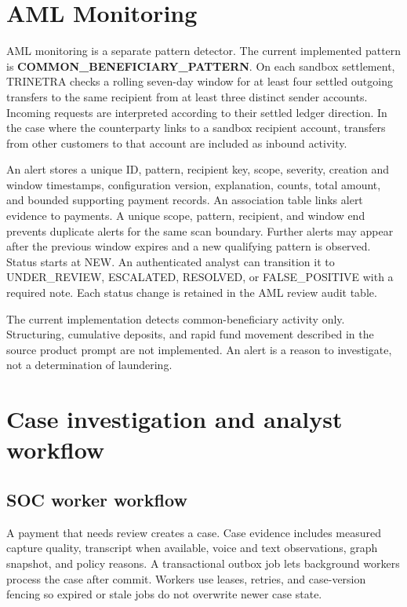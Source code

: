 \documentclass[11pt,a4paper]{article}
\begin{document}
\section{AML Monitoring}
AML monitoring is a separate pattern detector. The current implemented pattern is \textbf{COMMON\_BENEFICIARY\_PATTERN}. On each sandbox settlement, TRINETRA checks a rolling seven-day window for at least four settled outgoing transfers to the same recipient from at least three distinct sender accounts. Incoming requests are interpreted according to their settled ledger direction. In the case where the counterparty links to a sandbox recipient account, transfers from other customers to that account are included as inbound activity.

An alert stores a unique ID, pattern, recipient key, scope, severity, creation and window timestamps, configuration version, explanation, counts, total amount, and bounded supporting payment records. An association table links alert evidence to payments. A unique scope, pattern, recipient, and window end prevents duplicate alerts for the same scan boundary. Further alerts may appear after the previous window expires and a new qualifying pattern is observed. Status starts at NEW. An authenticated analyst can transition it to UNDER\_REVIEW, ESCALATED, RESOLVED, or FALSE\_POSITIVE with a required note. Each status change is retained in the AML review audit table.

The current implementation detects common-beneficiary activity only. Structuring, cumulative deposits, and rapid fund movement described in the source product prompt are not implemented. An alert is a reason to investigate, not a determination of laundering.

\section{Case investigation and analyst workflow}
\subsection{SOC worker workflow}
A payment that needs review creates a case. Case evidence includes measured capture quality, transcript when available, voice and text observations, graph snapshot, and policy reasons. A transactional outbox job lets background workers process the case after commit. Workers use leases, retries, and case-version fencing so expired or stale jobs do not overwrite newer case state.
\end{document}
